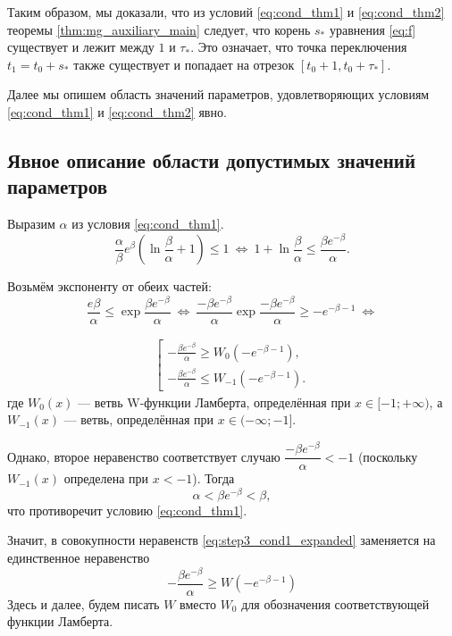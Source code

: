 Таким образом, мы доказали, что из условий \eqref{eq:cond_thm1} и \eqref{eq:cond_thm2} теоремы \ref{thm:mg_auxiliary_main} следует, что корень $s_*$ уравнения \eqref{eq:f} существует и лежит между $1$ и $\tau_*$. Это означает, что точка переключения $t_1 = t_0 + s_*$ также существует и попадает на отрезок $[t_0 + 1, t_0 + \tau_*]$.

Далее мы опишем область значений параметров, удовлетворяющих условиям \eqref{eq:cond_thm1} и \eqref{eq:cond_thm2} явно.

\subsection{Явное описание области допустимых значений параметров}

Выразим $\alpha$ из условия \eqref{eq:cond_thm1}.
\begin{equation*}
\frac{\alpha}{\beta}e^{\beta}\left(\ln\frac{\beta}{\alpha} + 1\right) \leqslant 1\ \Leftrightarrow\ 1 + \ln\dfrac{\beta}{\alpha} \leqslant \dfrac{\beta e^{-\beta}}{\alpha}.
\end{equation*}

Возьмём экспоненту от обеих частей:
\begin{equation*}
\dfrac{e\beta}{\alpha} \leqslant \exp\dfrac{\beta e^{-\beta}}{\alpha}\ \Leftrightarrow\ \dfrac{-\beta e^{-\beta}}{\alpha}\exp \dfrac{-\beta e^{-\beta}}{\alpha} \geqslant -e^{-\beta - 1}\ \Leftrightarrow
\end{equation*}

\begin{align}
\label{eq:step3_cond1_expanded}
\left[
\begin{array}{ll}
	-\frac{\beta e^{-\beta}}{\alpha} \geqslant W_0(-e^{-\beta - 1}),\\
	-\frac{\beta e^{-\beta}}{\alpha} \leqslant W_{-1}(-e^{-\beta - 1}).
\end{array}
\right.
\end{align}
%
где $W_0(x)$ --- ветвь W-функции Ламберта, определённая при $x \in [-1; +\infty)$, а $W_{-1}(x)$ --- ветвь, определённая при $x \in (-\infty; -1]$.

Однако, второе неравенство соответствует случаю $\dfrac{-\beta e^{-\beta}}{\alpha} < -1$ (поскольку $W_{-1}(x)$ определена при $x < -1$). Тогда
\begin{equation*}
\alpha < \beta e^{-\beta} < \beta,
\end{equation*}
что противоречит условию \eqref{eq:cond_thm1}.

Значит, в совокупности неравенств \eqref{eq:step3_cond1_expanded} заменяется на единственное неравенство
\begin{equation}
\label{eq:step3_cond1}
-\frac{\beta e^{-\beta}}{\alpha} \geqslant W(-e^{-\beta - 1})
\end{equation}
Здесь и далее, будем писать $W$ вместо $W_0$ для обозначения соответствующей функции Ламберта.

